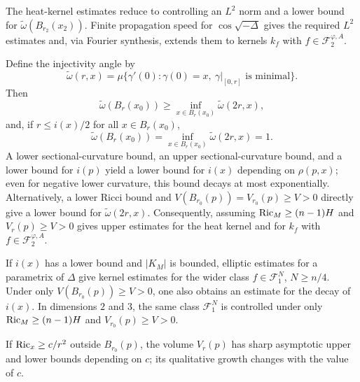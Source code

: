 The heat-kernel estimates reduce to controlling an $L^2$ norm and a lower bound
for $\widetilde\omega(B_{r_2}(x_2))$. Finite propagation speed for
$\cos\sqrt{-\Delta}$ gives the required $L^2$ estimates and, via Fourier synthesis,
extends them to kernels $k_f$ with $f\in\mathcal F_2^{\varphi,A}$.

Define the injectivity angle by
\begin{equation}
\widetilde\omega(r,x)=\mu\{\gamma'(0):\gamma(0)=x,\ \gamma|_{[0,r]}
\text{ is minimal}\}.
\tag{0.7}
\end{equation}
Then
\begin{equation}
\widetilde\omega(B_r(x_0))\geq\inf_{x\in B_r(x_0)}\widetilde\omega(2r,x),
\tag{0.8}
\end{equation}
and, if $r\leq i(x)/2$ for all $x\in B_r(x_0)$,
\begin{equation}
\widetilde\omega(B_r(x_0))=\inf_{x\in B_r(x_0)}\widetilde\omega(2r,x)=1.
\tag{0.9}
\end{equation}
A lower sectional-curvature bound, an upper sectional-curvature bound, and a
lower bound for $i(p)$ yield a lower bound for $i(x)$ depending on
$\rho(p,x)$; even for negative lower curvature, this bound decays at most
exponentially. Alternatively, a lower Ricci bound and
$V(B_{r_0}(p))=V_{r_0}(p)\geq V>0$ directly give a lower bound for
$\widetilde\omega(2r,x)$. Consequently, assuming
$\operatorname{Ric}_M\geq(n-1)H$ and $V_r(p)\geq V>0$ gives upper estimates for the heat
kernel and for $k_f$ with $f\in\mathcal F_2^{\varphi,A}$.

If $i(x)$ has a lower bound and $|K_M|$ is bounded, elliptic estimates for a
parametrix of $\Delta$ give kernel estimates for the wider class
$f\in\mathcal F_1^N$, $N\geq n/4$. Under only
$V(B_{r_0}(p))\geq V>0$, one also obtains an estimate for the decay of $i(x)$.
In dimensions $2$ and $3$, the same class $\mathcal F_1^N$ is controlled under
only $\operatorname{Ric}_M\geq(n-1)H$ and $V_{r_0}(p)\geq V>0$.

If $\operatorname{Ric}_x\geq c/r^2$ outside $B_{r_0}(p)$, the volume $V_r(p)$ has sharp
asymptotic upper and lower bounds depending on $c$; its qualitative growth
changes with the value of $c$.
